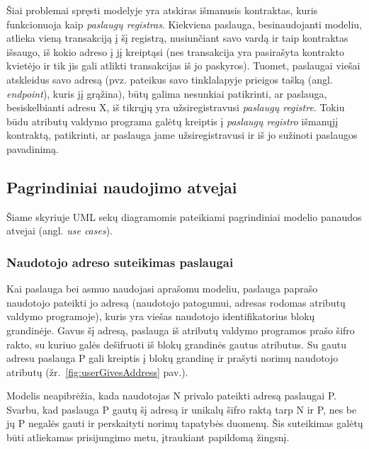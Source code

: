 Šiai problemai spręsti modelyje yra atskiras išmanusis kontraktas, kuris funkcionuoja kaip \textit{paslaugų registras}. Kiekviena
paslauga, besinaudojanti modeliu, atlieka vieną transakciją į šį registrą, nusiunčiant savo vardą ir taip kontraktas išsaugo, iš kokio adreso į jį kreiptąsi (nes
transakcija yra pasirašyta kontrakto kvietėjo ir tik jis gali atlikti transakcijas iš jo paskyros). Tuomet, paslaugai viešai
atskleidus savo adresą (pvz. pateikus savo tinklalapyje prieigos tašką (angl. \textit{endpoint}), kuris jį grąžina), būtų galima
nesunkiai patikrinti, ar paslauga, besiskelbianti adresu X, iš tikrųjų yra užsiregistravusi \textit{paslaugų registre}. Tokiu būdu
atributų valdymo programa galėtų kreiptis į \textit{paslaugų registro} išmanųjį kontraktą, patikrinti, ar paslauga jame užsiregistravusi ir iš jo sužinoti paslaugos
pavadinimą. 

\subsection{Pagrindiniai naudojimo atvejai}

Šiame skyriuje UML sekų diagramomis pateikiami pagrindiniai modelio panaudos atvejai (angl. \textit{use cases}).

\subsubsection{Naudotojo adreso suteikimas paslaugai}

Kai paslauga bei asmuo naudojasi aprašomu modeliu, paslauga paprašo naudotojo pateikti jo adresą (naudotojo patogumui, adresas rodomas
atributų valdymo programoje),
kuris yra viešas naudotojo identifikatorius blokų grandinėje.
Gavus šį adresą, paslauga iš atributų valdymo programos prašo šifro rakto, su kuriuo galės dešifruoti iš blokų grandinės gautus atributus.
Su gautu adresu paslauga P gali kreiptis į blokų grandinę ir prašyti norimų naudotojo atributų (žr.\hypertarget{fig:userGivesAddress}{~\ref{fig:userGivesAddress} pav.}).

Modelis neapibrėžia, kada naudotojas N privalo pateikti adresą paslaugai P. Svarbu, kad paslauga P gautų šį adresą ir unikalų šifro raktą tarp N ir P,
nes be jų P negalės gauti ir perskaityti norimų tapatybės duomenų. Šis suteikimas galėtų būti atliekamas prisijungimo metu, įtraukiant
papildomą žingsnį.

